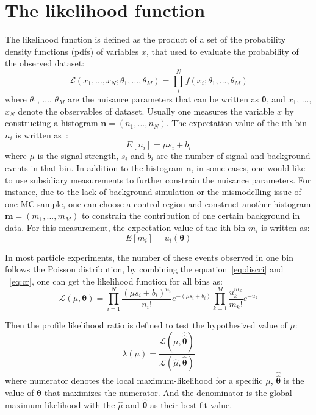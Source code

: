 \section{The likelihood function}

The likelihood function is defined as the product of a set of the probability density functions (pdfs) of variables $x$, that used to evaluate the probability of the observed dataset:
\begin{equation}\label{eq:likelihoodf}
    \mathcal{L} (x_{1}, ..., x_{N}; \theta_{1}, ..., \theta_{M}) = \prod_{i}^{N} f(x_{i}; \theta_{1}, ..., \theta_{M})
\end{equation}
where $\theta_{1}$, ..., $\theta_{M}$ are the nuisance parameters that can be written as $\pmb{\theta}$,
and $x_{1}$, ..., $x_{N}$ denote the observables of dataset. 
Usually one measures the variable $x$ by constructing a histogram $\pmb{n} = (n_{1}, ..., n_{N})$.
The expectation value of the ith bin $n_{i}$ is written as~\cite{Cowan:2010js}:
\begin{equation}\label{eq:discri}
    E[n_{i}] = \mu s_{i} + b_{i}
\end{equation}
where $\mu$ is the signal strength, $s_{i}$ and $b_{i}$ are the number of signal and background events in that bin.
In addition to the histogram $\pmb{n}$, in some cases, one would like to use subsidiary measurements to further constrain the nuisance parameters.
For instance, due to the lack of background simulation or the mismodelling issue of one MC sample, one can choose a control region and construct another histogram $\pmb{m} = (m_{1}, ..., m_{M})$ to constrain the contribution of one certain background in data.
For this measurement, the expectation value of the ith bin $m_{i}$ is written as:
\begin{equation}\label{eq:cr}
    E[m_i] = u_i(\pmb{\theta})
\end{equation}

In most particle experiments, the number of these events observed in one bin follows the Poisson distribution,
by combining the equation~\ref{eq:discri} and ~\ref{eq:cr}, one can get the likelihood function for all bins as:
\begin{equation}
    \mathcal{L} (\mu, \pmb{\theta}) = \prod_{i=1}^{N} \frac{(\mu s_{i} + b_{i})^{n_i}}{n_i !} e^{-(\mu s_{i} + b_{i})}
    \prod_{k=1}^{M} \frac{u_k^{m_k}}{m_k !} e^{-u_k}
\end{equation}

Then the profile likelihood ratio is defined to test the hypothesized value of $\mu$:
\begin{equation} \label{eq:lambda}
    \lambda (\mu) = \frac{\mathcal{L}(\mu, \pmb{\hat{\hat{\theta}}})}{\mathcal{L}(\hat{\mu}, \pmb{\hat{\theta}})}
\end{equation}
where numerator denotes the local maximum-likelihood for a specific $\mu$, $\pmb{\hat{\hat{\theta}}}$ is the value of $\pmb{\theta}$ that maximizes the numerator.
And the denominator is the global maximum-likelihood with the $\hat{\mu}$ and $\pmb{\hat{\theta}}$ as their best fit value.
